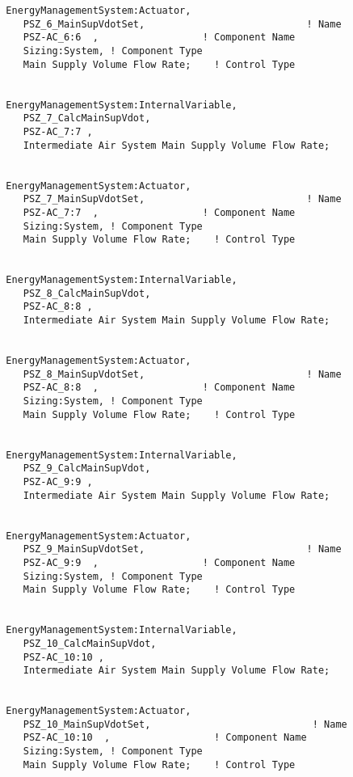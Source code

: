 \begin{lstlisting}
  EnergyManagementSystem:Actuator,
     PSZ_6_MainSupVdotSet,                            ! Name
     PSZ-AC_6:6  ,                  ! Component Name
     Sizing:System, ! Component Type
     Main Supply Volume Flow Rate;    ! Control Type


  EnergyManagementSystem:InternalVariable,
     PSZ_7_CalcMainSupVdot,
     PSZ-AC_7:7 ,
     Intermediate Air System Main Supply Volume Flow Rate;


  EnergyManagementSystem:Actuator,
     PSZ_7_MainSupVdotSet,                            ! Name
     PSZ-AC_7:7  ,                  ! Component Name
     Sizing:System, ! Component Type
     Main Supply Volume Flow Rate;    ! Control Type


  EnergyManagementSystem:InternalVariable,
     PSZ_8_CalcMainSupVdot,
     PSZ-AC_8:8 ,
     Intermediate Air System Main Supply Volume Flow Rate;


  EnergyManagementSystem:Actuator,
     PSZ_8_MainSupVdotSet,                            ! Name
     PSZ-AC_8:8  ,                  ! Component Name
     Sizing:System, ! Component Type
     Main Supply Volume Flow Rate;    ! Control Type


  EnergyManagementSystem:InternalVariable,
     PSZ_9_CalcMainSupVdot,
     PSZ-AC_9:9 ,
     Intermediate Air System Main Supply Volume Flow Rate;


  EnergyManagementSystem:Actuator,
     PSZ_9_MainSupVdotSet,                            ! Name
     PSZ-AC_9:9  ,                  ! Component Name
     Sizing:System, ! Component Type
     Main Supply Volume Flow Rate;    ! Control Type


  EnergyManagementSystem:InternalVariable,
     PSZ_10_CalcMainSupVdot,
     PSZ-AC_10:10 ,
     Intermediate Air System Main Supply Volume Flow Rate;


  EnergyManagementSystem:Actuator,
     PSZ_10_MainSupVdotSet,                            ! Name
     PSZ-AC_10:10  ,                  ! Component Name
     Sizing:System, ! Component Type
     Main Supply Volume Flow Rate;    ! Control Type
\end{lstlisting}
